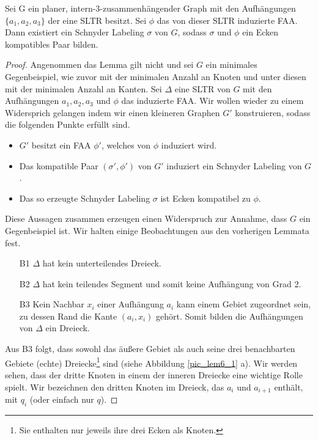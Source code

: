 

\begin{lemma}\label{lem6}
Sei G ein planer, intern-3-zusammenhängender Graph mit den Aufhängungen $\{a_1,a_2,a_3\}$ der eine SLTR besitzt. Sei $\phi$ das von dieser SLTR induzierte FAA. Dann existiert ein Schnyder Labeling $\sigma$ von $G$, sodass $\sigma$ und $\phi$ ein Ecken kompatibles Paar bilden.
\end{lemma}

\begin{proof}
Angenommen das Lemma gilt nicht und sei $G$ ein minimales Gegenbeispiel, wie zuvor mit der minimalen Anzahl an Knoten und unter diesen mit der minimalen Anzahl an Kanten. Sei $\Delta$ eine SLTR von $G$ mit den Aufhängungen $a_1,a_2,a_3$ und $\phi$ das induzierte FAA. Wir wollen wieder zu einem Widersprich gelangen indem wir einen kleineren Graphen $G'$ konstruieren, sodass die folgenden Punkte erfüllt sind.
\begin{itemize}
\item $G'$ besitzt ein FAA $\phi'$, welches von $\phi$ induziert wird.
\item Das kompatible Paar $(\sigma',\phi')$ von $G'$ induziert ein Schnyder Labeling von $G$.
\item Das so erzeugte Schnyder Labeling $\sigma$ ist Ecken kompatibel zu $\phi$.
\end{itemize}
Diese Aussagen zusammen erzeugen einen Widerspruch zur Annahme, dass $G$ ein Gegenbeispiel ist. Wir halten einige Beobachtungen aus den vorherigen Lemmata fest.
\begin{itemize}
\item [B1] $\Delta$ hat kein unterteilendes Dreieck.
\item [B2] $\Delta$ hat kein teilendes Segment und somit keine Aufhängung von Grad 2.
\item [B3] Kein Nachbar $x_i$ einer Aufhängung $a_i$ kann einem Gebiet zugeordnet sein, zu dessen Rand die Kante $(a_i,x_i)$ gehört. Somit bilden die Aufhängungen von $\Delta$ ein Dreieck.
\end{itemize}

Aus B3 folgt, dass sowohl das äußere Gebiet als auch seine drei benachbarten Gebiete (echte) Dreiecke\footnote{Sie enthalten nur jeweils ihre drei Ecken als Knoten.} sind (siehe Abbildung \ref{pic_lem6_1} a). Wir werden sehen, dass der dritte Knoten in einem der inneren Dreiecke eine wichtige Rolle spielt. Wir bezeichnen den dritten Knoten im Dreieck, das $a_i$ und $a_{i+1}$ enthält, mit $q_i$ (oder einfach nur $q$).


\end{proof}
